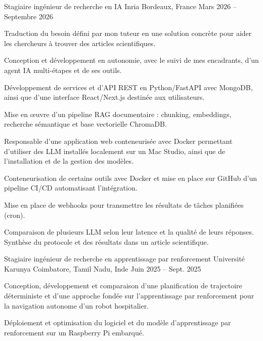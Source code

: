 
\begin{cventries}
  \cventry
    {Stagiaire ingénieur de recherche en IA}
    {Inria}
    {Bordeaux, France}
    {Mars 2026 -- Septembre 2026}
    {
      \begin{cvitems}
        \item {Traduction du besoin défini par mon tuteur en une solution concrète pour aider les chercheurs à trouver des articles scientifiques.}
        \item {Conception et développement en autonomie, avec le suivi de mes encadrants, d’un agent IA multi-étapes et de ses outils.}
        \item {Développement de services et d’API REST en Python/FastAPI avec MongoDB, ainsi que d’une interface React/Next.js destinée aux utilisateurs.}
        \item {Mise en œuvre d’un pipeline RAG documentaire : chunking, embeddings, recherche sémantique et base vectorielle ChromaDB.}
        \item {Responsable d’une application web conteneurisée avec Docker permettant d’utiliser des LLM installés localement sur un Mac Studio, ainsi que de l’installation et de la gestion des modèles.}
        \item {Conteneurisation de certains outils avec Docker et mise en place sur GitHub d’un pipeline CI/CD automatisant l’intégration.}
        \item {Mise en place de webhooks pour transmettre les résultats de tâches planifiées (cron).}
        \item {Comparaison de plusieurs LLM selon leur latence et la qualité de leurs réponses. Synthèse du protocole et des résultats dans un article scientifique.}
      \end{cvitems}
    }

  \cventry
    {Stagiaire ingénieur de recherche en apprentissage par renforcement}
    {Université Karunya}
    {Coimbatore, Tamil Nadu, Inde}
    {Juin 2025 -- Sept. 2025}
    {
      \begin{cvitems}
        \item {Conception, développement et comparaison d’une planification de trajectoire déterministe et d’une approche fondée sur l’apprentissage par renforcement pour la navigation autonome d’un robot hospitalier.}
        \item {Déploiement et optimisation du logiciel et du modèle d’apprentissage par renforcement sur un Raspberry Pi embarqué.}
      \end{cvitems}
    }
\end{cventries}
